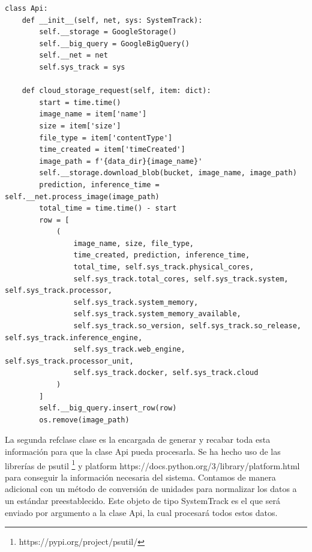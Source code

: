\begin{lstlisting}[caption=Api, label=lst:api, float=t]
    class Api:
    def __init__(self, net, sys: SystemTrack):
        self.__storage = GoogleStorage()
        self.__big_query = GoogleBigQuery()
        self.__net = net
        self.sys_track = sys

    def cloud_storage_request(self, item: dict):
        start = time.time()
        image_name = item['name']
        size = item['size']
        file_type = item['contentType']
        time_created = item['timeCreated']
        image_path = f'{data_dir}{image_name}'
        self.__storage.download_blob(bucket, image_name, image_path)
        prediction, inference_time = self.__net.process_image(image_path)
        total_time = time.time() - start
        row = [
            (
                image_name, size, file_type,
                time_created, prediction, inference_time,
                total_time, self.sys_track.physical_cores,
                self.sys_track.total_cores, self.sys_track.system, self.sys_track.processor,
                self.sys_track.system_memory,
                self.sys_track.system_memory_available,
                self.sys_track.so_version, self.sys_track.so_release, self.sys_track.inference_engine,
                self.sys_track.web_engine, self.sys_track.processor_unit,
                self.sys_track.docker, self.sys_track.cloud
            )
        ]
        self.__big_query.insert_row(row)
        os.remove(image_path)
\end{lstlisting}
La segunda refclase clase es la encargada de generar y recabar toda esta información para que la clase Api pueda procesarla.
Se ha hecho uso de las librerías de psutil \footnote{ https://pypi.org/project/psutil/} y platform {https://docs.python.org/3/library/platform.html} para conseguir la información necesaria del sistema.
Contamos de manera adicional con un método de conversión de unidades para normalizar los datos a un estándar preestablecido.
Este objeto de tipo SystemTrack es el que será enviado por argumento a la clase Api, la cual procesará todos estos datos.
